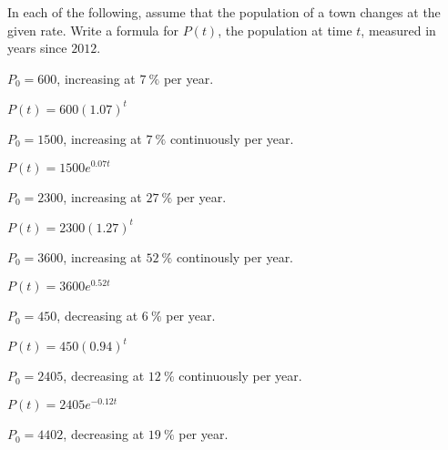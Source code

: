 \begin{exercises}
\begin{problem}
In each of the following, assume that the population of a town 
changes at the given rate.
Write a formula for $P(t)$, the population at time $t$,
measured in years since $2012$.
\begin{multicols}{2}
	\begin{subproblem}
		$P_0=600$, increasing at $\SI{7}{\percent}$ per year.
		\begin{shortsolution}
			$P(t)=600(1.07)^t$ 
		\end{shortsolution}
	\end{subproblem}
	\begin{subproblem}
		$P_0=1500$, increasing at $\SI{7}{\percent}$ continuously per year.
		\begin{shortsolution}
			$P(t)=1500e^{0.07t}$
		\end{shortsolution}
	\end{subproblem}
	\begin{subproblem}
		$P_0=2300$, increasing at $\SI{27}{\percent}$ per year.
		\begin{shortsolution}
			$P(t)=2300(1.27)^t$ 
		\end{shortsolution}
	\end{subproblem}
	\begin{subproblem}
		$P_0=3600$, increasing at $\SI{52}{\percent}$ continously per year.
		\begin{shortsolution}
			$P(t)=3600e^{0.52t}$
		\end{shortsolution}
	\end{subproblem}
	\begin{subproblem}
		$P_0=450$, decreasing at $\SI{6}{\percent}$ per year.
		\begin{shortsolution}
			$P(t)=450(0.94)^t$ 
		\end{shortsolution}
	\end{subproblem}
	\begin{subproblem}
		$P_0=2405$, decreasing at $\SI{12}{\percent}$ continuously per year.
		\begin{shortsolution}
			$P(t)=2405e^{-0.12t}$
		\end{shortsolution}
	\end{subproblem}
	\begin{subproblem}
		$P_0=4402$, decreasing at $\SI{19}{\percent}$ per year.

\end{subproblem}
\end{multicols}
\end{problem}
\end{exercises}
